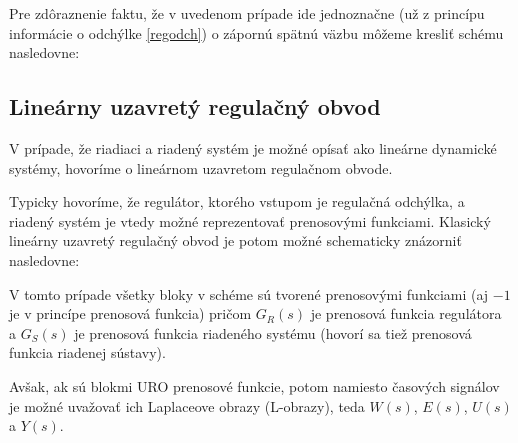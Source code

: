 \documentclass[a4paper, 10pt, ]{article}
\begin{document}
Pre zdôraznenie faktu, že v uvedenom prípade ide jednoznačne (už z princípu informácie o odchýlke \eqref{regodch}) o zápornú spätnú väzbu môžeme kresliť schému nasledovne:

\begin{center}


    \vspace{-2mm}

	\label{schURO_regodchminus.pdf}

\end{center}




\subsection{Lineárny uzavretý regulačný obvod}

V prípade, že riadiaci a riadený systém je možné opísať ako lineárne dynamické systémy, hovoríme o lineárnom uzavretom regulačnom obvode.

Typicky hovoríme, že regulátor, ktorého vstupom je regulačná odchýlka, a riadený systém je vtedy možné reprezentovať prenosovými funkciami. Klasický lineárny uzavretý regulačný obvod je potom možné schematicky znázorniť nasledovne:

\begin{center}

    


    \vspace{-3mm}

	\label{schLinURO_basic.pdf}

\end{center}

V tomto prípade všetky bloky v schéme sú tvorené prenosovými funkciami (aj $-1$ je v princípe prenosová funkcia) pričom $G_R(s)$ je prenosová funkcia regulátora a  $G_S(s)$ je prenosová funkcia riadeného systému (hovorí sa tiež prenosová funkcia riadenej sústavy).

Avšak, ak sú blokmi URO prenosové funkcie, potom namiesto časových signálov je možné uvažovať ich Laplaceove obrazy (L-obrazy), teda $W(s)$, $E(s)$, $U(s)$ a $Y(s)$.
\end{document}
